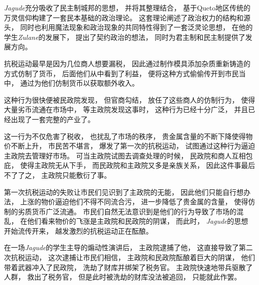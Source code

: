 \documentclass[UTF8,12pt]{ctexbook}
\begin{document}
                \emph{Jagude}充分吸收了民主制城邦的思想，
                并将其整理结合，
                基于Queto地区传统的万灵信仰构建了一套民本基础的政治理论。
                这套理论阐述了政治权力的结构和源头，
                同时也利用魔法现象和政治现象的共同特性得到了一套泛灵论思想，
                在他的学生\emph{Zulane}的发展下，
                提出了契约政治的想法，
                同时为君主制和民主制提供了发展方向。

                抗税运动最早是因为几位商人想要漏税，
                因此通过制作模具添加杂质重新铸造的方式仿制了货币，
                后面他们从中看到了利益，
                便将这种方式偷偷传开到市民当中，
                通过为他们仿制货币以获取额外收入。

                这种行为很快便被民政院发现，
                但官商勾结，
                放任了这些商人的仿制行为，
                使得大量劣币流通在市场中，
                等主政院发现这事时，
                这种行为已经十分广泛，
                并且已经出现了一套完整的产业了。

                这一行为不仅危害了税收，
                也扰乱了市场的秩序，
                贵金属含量的不断下降使得物价不断上升，
                市民苦不堪言，
                爆发了第一次的抗税运动，
                试图通过这种行为逼迫主政院去管理好市场。
                可当主政院试图去调查处理的时候，
                民政院和商人互相包庇，
                使得主政院无从下手，
                而民政院和主政院又多是亲族关系，
                因此这件事最后不了了之，
                主政院只能敷衍了事。

                第一次抗税运动的失败让市民们见识到了主政院的无能，
                因此他们只能自行想办法，
                上涨的物价逼迫他们不得不同流合污，
                进一步降低了贵金属的含量，
                使得仿制的劣质货币广泛流通。
                市民们自然无法意识到是他们的行为导致了市场的混乱，
                在他们看来物价的飞涨是主政院和民政院的阴谋，
                而此时，
                \emph{Jagude}的思想开始流传开来，
                越发激烈的抗税运动正在酝酿。
                
                在一场\emph{Jagude}的学生主导的煽动性演讲后，
                主政院逮捕了他，
                这直接导致了第二次抗税运动，
                这次逮捕让市民们相信，
                主政院和民政院酝酿着巨大的阴谋，
                他们带着武器冲入了民政院，
                洗劫了财库并绑架了税务官。
                主政院快速地带兵驱散了人群，
                救出了税务官，
                但是此时被洗劫的财库没法被追回，
                只能就此作罢。
\end{document}
